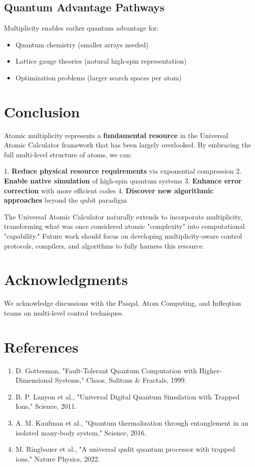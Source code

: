 \documentclass[12pt,twocolumn]{article}
\begin{document}
\subsection{Quantum Advantage Pathways}
Multiplicity enables earlier quantum advantage for:
\begin{itemize}
\item Quantum chemistry (smaller arrays needed)
\item Lattice gauge theories (natural high-spin representation)
\item Optimization problems (larger search spaces per atom)
\end{itemize}

\section{Conclusion}

Atomic multiplicity represents a \textbf{fundamental resource} in the Universal Atomic Calculator framework that has been largely overlooked. By embracing the full multi-level structure of atoms, we can:

1. \textbf{Reduce physical resource requirements} via exponential compression
2. \textbf{Enable native simulation} of high-spin quantum systems
3. \textbf{Enhance error correction} with more efficient codes
4. \textbf{Discover new algorithmic approaches} beyond the qubit paradigm

The Universal Atomic Calculator naturally extends to incorporate multiplicity, transforming what was once considered atomic "complexity" into computational "capability." Future work should focus on developing multiplicity-aware control protocols, compilers, and algorithms to fully harness this resource.

\section*{Acknowledgments}
We acknowledge discussions with the Pasqal, Atom Computing, and Infleqtion teams on multi-level control techniques.

\section*{References}
\begin{enumerate}
\item D. Gottesman, "Fault-Tolerant Quantum Computation with Higher-Dimensional Systems," Chaos, Solitons \& Fractals, 1999.
\item B. P. Lanyon et al., "Universal Digital Quantum Simulation with Trapped Ions," Science, 2011.
\item A. M. Kaufman et al., "Quantum thermalization through entanglement in an isolated many-body system," Science, 2016.
\item M. Ringbauer et al., "A universal qudit quantum processor with trapped ions," Nature Physics, 2022.
\end{enumerate}
\end{document}
